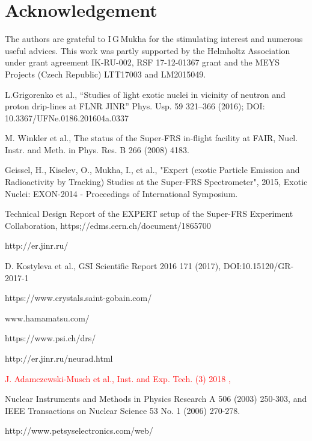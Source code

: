 \documentclass{webofc}
\newcommand{\red}[1]{\textcolor{red}{#1}}
\begin{document}
\section{Acknowledgement}
The authors are grateful to I\,G\,Mukha for the stimulating interest and numerous useful advices.
This  work was partly supported by the Helmholtz Association under grant agreement IK-RU-002, RSF 17-12-01367 grant and the MEYS Projects (Czech Republic) LTT17003 and LM2015049.
	
\begin{thebibliography}{99}
	L.Grigorenko et al., “Studies of light exotic nuclei in vicinity of neutron and proton drip-lines at FLNR JINR” Phys. Usp. 59 321–366 (2016); DOI: 10.3367/UFNe.0186.201604a.0337
		
	M. Winkler et al., The status of the Super-FRS in-flight facility at FAIR, Nucl. Instr. and Meth. in Phys. Res. B 266 (2008) 4183.
	
	Geissel, H., Kiselev, O., Mukha, I., et al., "Expert (exotic Particle Emission and Radioactivity by Tracking) Studies at the Super-FRS Spectrometer", 2015, Exotic Nuclei: EXON-2014 - Proceedings of International Symposium.
	
	Technical Design Report of the EXPERT setup of the Super-FRS Experiment Collaboration, https;//edms.cern.ch/document/1865700

	http://er.jinr.ru/

	D. Kostyleva et al., GSI Scientific Report 2016 171 (2017), DOI:10.15120/GR-2017-1
	
	https://www.crystals.saint-gobain.com/
	
	www.hamamatsu.com/
	
	https://www.psi.ch/drs/
	
	http://er.jinr.ru/neurad.html
	
	\red{J. Adamczewski-Musch et al., Inst. and Exp. Tech. (3) 2018 ,}
	
	Nuclear Instruments and Methods in Physics Research A 506 (2003) 250-303, and
	IEEE Transactions on Nuclear Science 53 No. 1 (2006) 270-278.
	
	http://www.petsyselectronics.com/web/
	
\end{thebibliography}
\end{document}
